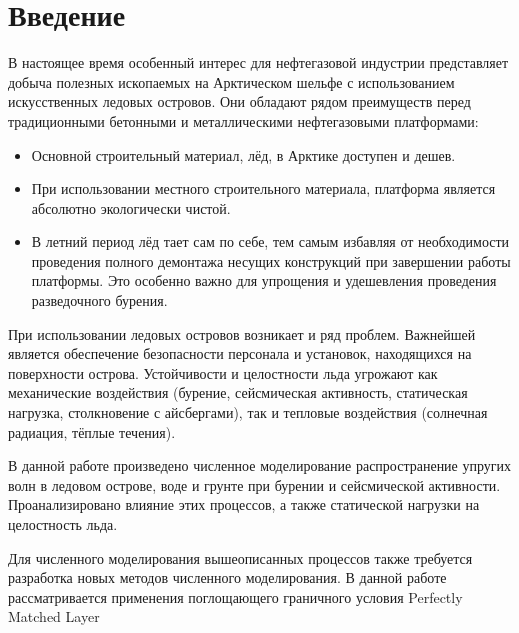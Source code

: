 \section{Введение}

В настоящее время особенный интерес для нефтегазовой индустрии представляет добыча полезных ископаемых на Арктическом шельфе с использованием искусственных ледовых островов. Они обладают рядом преимуществ перед традиционными бетонными и металлическими нефтегазовыми платформами:

\begin{itemize}
    \item Основной строительный материал, лёд, в Арктике доступен и дешев.
    \item При использовании местного строительного материала, платформа является абсолютно экологически чистой.
    \item  В летний период лёд тает сам по себе, тем самым избавляя от необходимости проведения полного демонтажа несущих конструкций при завершении работы платформы. Это особенно важно для упрощения и удешевления проведения разведочного бурения.
\end{itemize}

При использовании ледовых островов возникает и ряд проблем. Важнейшей является обеспечение безопасности персонала и установок, находящихся на  поверхности острова. Устойчивости и целостности льда угрожают как механические воздействия (бурение, сейсмическая активность, статическая нагрузка, столкновение с айсбергами), так и тепловые воздействия (солнечная радиация, тёплые течения).

В данной работе произведено численное моделирование распространение упругих волн в ледовом острове, воде и грунте при бурении и сейсмической активности. Проанализировано влияние этих процессов, а также статической нагрузки на целостность льда.

Для численного моделирования вышеописанных процессов также требуется разработка новых методов численного моделирования. В данной работе рассматривается применения поглощающего граничного условия Perfectly Matched Layer